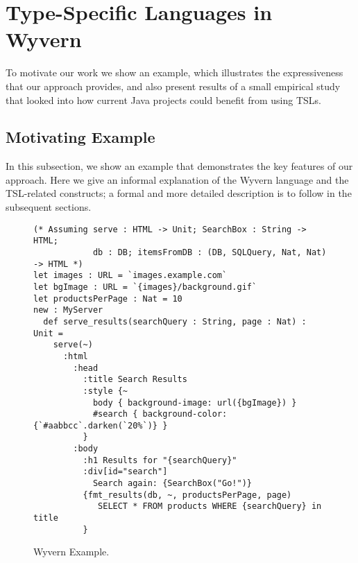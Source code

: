 
\section{Type-Specific Languages in Wyvern}
\label{s:motivation}

To motivate our work we show an example, which illustrates the expressiveness that our approach provides, and also present results of a small empirical study that looked into how current Java projects could  benefit from using TSLs.

\subsection{Motivating Example}

In this subsection, we show an example that demonstrates the key features of our approach. Here we give an informal explanation of the Wyvern language and the TSL-related constructs; a formal and more detailed description is to follow in the subsequent sections.


\begin{figure}[t]
\begin{lstlisting}
(* Assuming serve : HTML -> Unit; SearchBox : String -> HTML; 
            db : DB; itemsFromDB : (DB, SQLQuery, Nat, Nat) -> HTML *)
let images : URL = `images.example.com`
let bgImage : URL = `{images}/background.gif`
let productsPerPage : Nat = 10
new : MyServer
  def serve_results(searchQuery : String, page : Nat) : Unit =
    serve(~)
      :html
        :head
          :title Search Results
          :style {~
            body { background-image: url({bgImage}) }
            #search { background-color: {`#aabbcc`.darken(`20%`)} }
          }
        :body
          :h1 Results for "{searchQuery}"
          :div[id="search"]
            Search again: {SearchBox("Go!")}
          {fmt_results(db, ~, productsPerPage, page)
             SELECT * FROM products WHERE {searchQuery} in title
          }
\end{lstlisting}
\caption{Wyvern Example.}
\label{f-example}
\end{figure}


